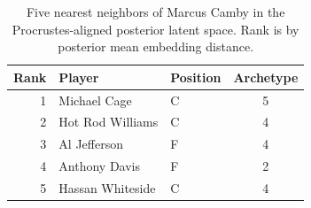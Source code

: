\begin{table}[htbp]
  \centering\small
  \begin{tabular}{rllc}
    \toprule
    Rank & Player & Position & Archetype \\
    \midrule
    1 & Michael Cage & C & 5 \\
    2 & Hot Rod Williams & C & 4 \\
    3 & Al Jefferson & F & 4 \\
    4 & Anthony Davis & F & 2 \\
    5 & Hassan Whiteside & C & 4 \\
    \bottomrule
  \end{tabular}
  \caption{Five nearest neighbors of Marcus Camby in the Procrustes-aligned posterior latent space. Rank is by posterior mean embedding distance.}
  \label{tab:Marcus_Camby_neighbors}
\end{table}

